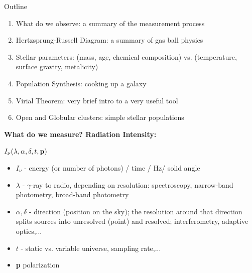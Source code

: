 \documentclass[letterpaper,landscape]{slides}
\begin{document}
\begin{slide}
\begin{center}
{\large \color{red} 
                                      Outline
}
\end{center}

\begin{enumerate}
\item {\color{blue} What do we observe:} a summary of the measurement process
\item {\color{blue} Hertzsprung-Russell Diagram:} a summary of gas ball physics
\item {\color{blue} Stellar parameters:} (mass, age, chemical composition) vs. 
(temperature, surface gravity, metalicity)
\item {\color{blue} Population Synthesis:} cooking up a galaxy
\item {\color{blue} Virial Theorem:} very brief intro to a very useful tool
\item {\color{blue} Open and Globular clusters:} simple stellar populations 
\end{enumerate}          
\vfill
\end{slide}




\begin{slide}
\begin{center}
\bfseries
{\large {\color{red} What do we measure? \color{blue} Radiation Intensity:}}
\end{center}
\vskip 0.6in

{\centerline {\Huge \bf {\color{blue} 
 $I_\nu (\lambda, \alpha, \delta, t, {\bf p})$ }}}

\begin{itemize}

\item $I_\nu$ - energy (or number of photons) / time / Hz/ solid angle 
\item $\lambda$ - $\gamma$-ray to radio, depending on resolution:
      spectroscopy, narrow-band photometry, broad-band photometry
\item $\alpha, \delta$ - direction (position on the sky); the resolution 
    around that direction splits sources into unresolved (point) and resolved;
    interferometry, adaptive optics,...
\item $t$ - static vs. variable universe, sampling rate,...
\item {\bf p} polarization
\end{itemize}
\end{slide}
 
\end{document}
